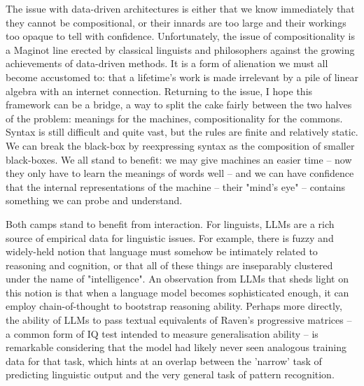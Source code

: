 The issue with data-driven architectures is either that we know immediately that they cannot be compositional, or their innards are too large and their workings too opaque to tell with confidence. Unfortunately, the issue of compositionality is a Maginot line erected by classical linguists and philosophers against the growing achievements of data-driven methods. It is a form of alienation we must all become accustomed to: that a lifetime's work is made irrelevant by a pile of linear algebra with an internet connection. Returning to the issue, I hope this framework can be a bridge, a way to split the cake fairly between the two halves of the problem: meanings for the machines, compositionality for the commons. Syntax is still difficult and quite vast, but the rules are finite and relatively static. We can break the black-box by reexpressing syntax as the composition of smaller black-boxes. We all stand to benefit: we may give machines an easier time -- now they only have to learn the meanings of words well -- and we can have confidence that the internal representations of the machine -- their "mind's eye" -- contains something we can probe and understand.


Both camps stand to benefit from interaction. For linguists, LLMs are a rich source of empirical data for linguistic issues. For example, there is fuzzy and widely-held notion that language must somehow be intimately related to reasoning and cognition, or that all of these things are inseparably clustered under the name of "intelligence". An observation from LLMs that sheds light on this notion is that when a language model becomes sophisticated enough, it can employ chain-of-thought \cite{} to bootstrap reasoning ability. Perhaps more directly, the ability of LLMs to pass textual equivalents of Raven's progressive matrices \cite{} -- a common form of IQ test intended to measure generalisation ability -- is remarkable considering that the model had likely never seen analogous training data for that task, which hints at an overlap between the 'narrow' task of predicting linguistic output and the very general task of pattern recognition.\\

